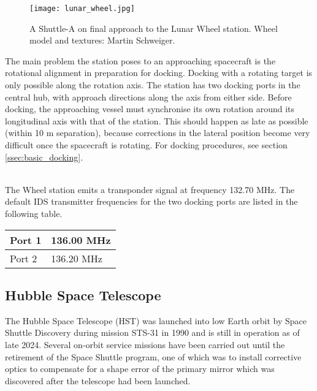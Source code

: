 \documentclass[Orbiter User Manual.tex]{subfiles}
\begin{document}
\begin{figure}[H]
  \centering
  \texttt{[image: lunar\_wheel.jpg]}
  \caption{A Shuttle-A on final approach to the Lunar Wheel station. Wheel model and textures: Martin Schweiger.}
\end{figure}

\noindent
The main problem the station poses to an approaching spacecraft is the rotational alignment in preparation for docking. Docking with a rotating target is only possible along the rotation axis. The station has two docking ports in the central hub, with approach directions along the axis from either side. Before docking, the approaching vessel must synchronise its own rotation around its longitudinal axis with that of the station. This should happen as late as possible (within 10 m separation), because corrections in the lateral position become very difficult once the spacecraft is rotating. For docking procedures, see section \ref{ssec:basic_docking}.\\


\noindent
\\
The Wheel station emits a transponder signal at frequency 132.70 MHz. The default IDS transmitter frequencies for the two docking ports are listed in the following table.

	\begin{longtable}{ |p{}|p{}| }
	\hline\rule{0pt}{2ex}
	Port 1 & 136.00  MHz\\
	\hline\rule{0pt}{2ex}
	Port 2 & 136.20  MHz\\
	\hline
	\end{longtable}


\subsection{Hubble Space Telescope}
The Hubble Space Telescope (HST) was launched into low Earth orbit by Space Shuttle Discovery during mission STS-31 in 1990 and is still in operation as of late 2024. Several on-orbit service missions have been carried out until the retirement of the Space Shuttle program, one of which was to install corrective optics to compensate for a shape error of the primary mirror which was discovered after the telescope had been launched.
\end{document}
